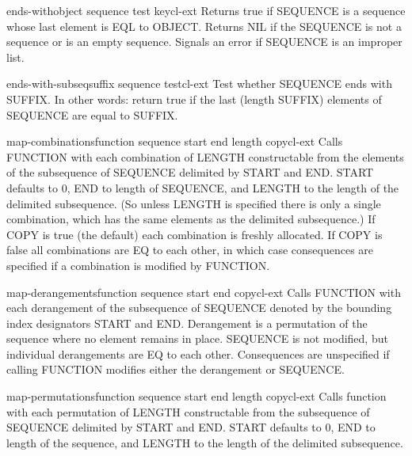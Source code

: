 \begin{function}{ends-with}{object sequence \key test key}{cl-ext}{}
  Returns true if SEQUENCE is a sequence whose last element is EQL to OBJECT.
Returns NIL if the SEQUENCE is not a sequence or is an empty sequence. Signals
an error if SEQUENCE is an improper list.
\end{function}

\begin{function}{ends-with-subseq}{suffix sequence \key test}{cl-ext}{}
  Test whether SEQUENCE ends with SUFFIX. In other words: return true if
the last (length SUFFIX) elements of SEQUENCE are equal to SUFFIX.
\end{function}

\begin{function}{map-combinations}{function sequence \key start end length copy}{cl-ext}{}
  Calls FUNCTION with each combination of LENGTH constructable from the
elements of the subsequence of SEQUENCE delimited by START and END. START
defaults to 0, END to length of SEQUENCE, and LENGTH to the length of the
delimited subsequence. (So unless LENGTH is specified there is only a single
combination, which has the same elements as the delimited subsequence.) If
COPY is true (the default) each combination is freshly allocated. If COPY is
false all combinations are EQ to each other, in which case consequences are
specified if a combination is modified by FUNCTION.
\end{function}

\begin{function}{map-derangements}{function sequence \key start end copy}{cl-ext}{}
  Calls FUNCTION with each derangement of the subsequence of SEQUENCE denoted
by the bounding index designators START and END. Derangement is a permutation
of the sequence where no element remains in place. SEQUENCE is not modified,
but individual derangements are EQ to each other. Consequences are unspecified
if calling FUNCTION modifies either the derangement or SEQUENCE.
\end{function}

\begin{function}{map-permutations}{function sequence \key start end length copy}{cl-ext}{}
  Calls function with each permutation of LENGTH constructable
from the subsequence of SEQUENCE delimited by START and END. START
defaults to 0, END to length of the sequence, and LENGTH to the
length of the delimited subsequence.
\end{function}

